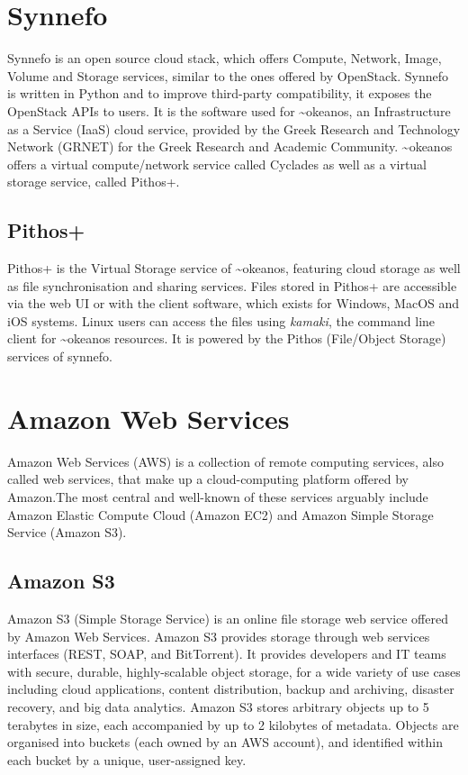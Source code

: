 \section{Synnefo}
  Synnefo\cite{synnefo} is an open source cloud stack, which offers Compute, Network, Image, Volume and Storage services, similar to the ones offered by OpenStack. Synnefo is written in Python and to improve third-party compatibility, it exposes the OpenStack APIs to users\cite{synnefo-api}. It is the software used for \textasciitilde okeanos\cite{okeanos}, an Infrastructure as a Service (IaaS) cloud service, provided by the Greek Research and Technology Network (GRNET) for the Greek Research and Academic Community. \textasciitilde okeanos offers a virtual compute/network service called Cyclades as well as a virtual storage service, called Pithos+.

  \subsection{Pithos+}
    Pithos+ is the Virtual Storage service of \textasciitilde okeanos, featuring cloud storage as well as file synchronisation and sharing services. Files stored in Pithos+ are accessible via the web UI or with the client software, which exists for Windows, MacOS and iOS systems. Linux users can access the files using \emph{kamaki}, the command line client for \textasciitilde okeanos resources. It is powered by the Pithos (File/Object Storage) services of synnefo.


\section{Amazon Web Services}
  Amazon Web Services (AWS) is a collection of remote computing services, also called web services, that make up a cloud-computing platform offered by Amazon.The most central and well-known of these services arguably include Amazon Elastic Compute Cloud (Amazon EC2) and Amazon Simple Storage Service (Amazon S3).

  \subsection{Amazon S3}
    Amazon S3\cite{amazon-s3} (Simple Storage Service) is an online file storage web service offered by Amazon Web Services. Amazon S3 provides storage through web services interfaces (REST, SOAP, and BitTorrent). It provides developers and IT teams with secure, durable, highly-scalable object storage, for a wide variety of use cases including cloud applications, content distribution, backup and archiving, disaster recovery, and big data analytics. Amazon S3 stores arbitrary objects up to 5 terabytes in size, each accompanied by up to 2 kilobytes of metadata. Objects are organised into buckets (each owned by an AWS account), and identified within each bucket by a unique, user-assigned key.

